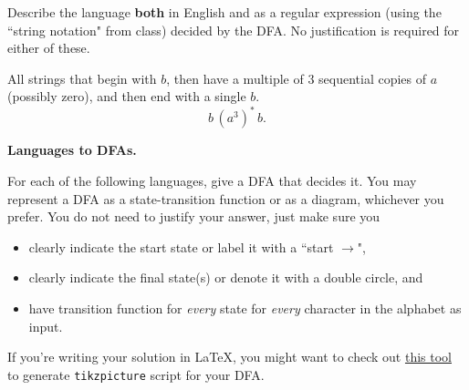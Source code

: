 \documentclass[11pt,addpoints,answers]{exam}
\begin{document}
\begin{questions}
\begin{parts}
\begin{center}
        \end{center} 

    Describe the language \textbf{both} in English and as a regular expression (using the ``string notation" from class) decided by the DFA. No justification is required for either of these.

    \begin{solution}
        All strings that begin with $b$, then have a multiple of $3$ sequential copies of $a$ (possibly zero), and then end with a single $b$.
        \[
        b\,(a^3)^*\,b.
        \]
    \end{solution}

\end{parts}

\pagebreak
\question \textbf{Languages to DFAs.} \label{L2D}

For each of the following languages, give a DFA that decides it. You may represent a DFA as a state-transition function or as a diagram, whichever you prefer. You do not need to justify your answer, just make sure you
\begin{itemize}
    \item clearly indicate the start state or label it with a ``start $\rightarrow$",
    \item clearly indicate the final state(s) or denote it with a double circle, and
    \item have transition function for \emph{every} state for \emph{every} character in the alphabet as input.
\end{itemize}

If you're writing your solution in \LaTeX, you might want to check out \href{https://madebyevan.com/fsm/}{this tool} to generate \texttt{tikzpicture} script for your DFA. 

\end{questions}
\end{document}
